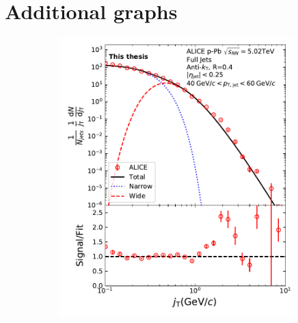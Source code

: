 
\chapter{Additional graphs}
\label{app:graphs}
\begin{figure}[h!]
\centering
\begin{subfigure}{0.36\textwidth}
\includegraphics[width=0.99\textwidth]{figures/results/JtSignalFinalFitJetPt4}

\end{subfigure}
\end{figure}
